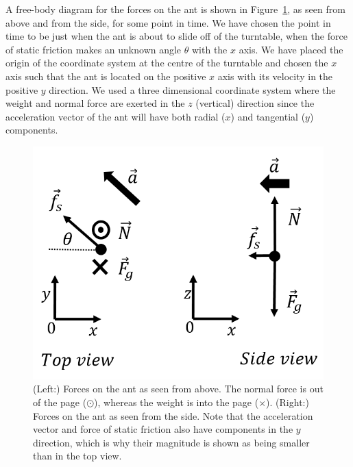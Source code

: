 \begin{framed}
\begin{framed}
A free-body diagram for the forces on the ant is shown in Figure~\ref{fig:applyingnewtonslaws:ant_fbd}, as seen from above and from the side, for some point in time. We have chosen the point in time to be just when the ant is about to slide off of the turntable, when the force of static friction makes an unknown angle $\theta$ with the $x$ axis. We have placed the origin of the coordinate system at the centre of the turntable and chosen the $x$ axis such that the ant is located on the positive $x$ axis with its velocity in the positive $y$ direction. We used a three dimensional coordinate system where the weight and normal force are exerted in the $z$ (vertical) direction since the acceleration vector of the ant will have both radial ($x$) and tangential ($y$) components.

\begin{figure}[!htbp]
\centering
\includegraphics[width=0.5\linewidth]{files/ant_fbd-57dca3079c2f89aaf00fa3c11af1f13f.png}
\caption[]{(Left:) Forces on the ant as seen from above. The normal force is out of the page ($\odot$), whereas the weight is into the page ($\times$). (Right:) Forces on the ant as seen from the side. Note that the acceleration vector and force of static friction also have components in the $y$ direction, which is why their magnitude is shown as being smaller than in the top view.}
\label{fig:applyingnewtonslaws:ant_fbd}
\end{figure}


\end{framed}
\end{framed}
